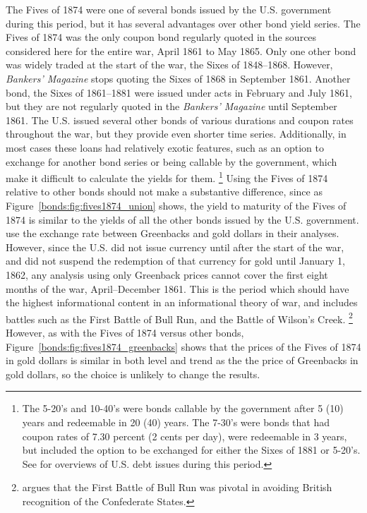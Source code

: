 The Fives of 1874 were one of several bonds issued by the U.S. government during this period, but it has several advantages over other bond yield series.
The Fives of 1874 was the only coupon bond regularly quoted in the sources considered here for the entire war, April 1861 to May 1865.
Only one other bond was widely traded at the start of the war, the Sixes of 1848--1868.
However, \textit{Bankers' Magazine} stops quoting the Sixes of 1868 in September 1861.
Another bond, the  Sixes of 1861--1881 were issued under acts in February and July 1861, but they are not regularly quoted in the \textit{Bankers' Magazine} until September 1861.
The U.S. issued several other bonds of various durations and coupon rates throughout the war, but they provide even shorter time series.
Additionally, in most cases these loans had relatively exotic features, such as an option to exchange for another bond series or being callable by the government, which make it difficult to calculate the yields for them.
\footnote{
  The 5-20's and 10-40's were bonds callable by the government after 5 (10) years and redeemable in 20 (40) years.
  The 7-30's were bonds that had coupon rates of 7.30 percent (2 cents per day), were redeemable in 3 years, but included the option to be exchanged for either the Sixes of 1881 or 5-20's.
  See \textcites{Bayley1882}{DeKnight1900}[297--309]{HomerSylla2005} for overviews of U.S. debt issues during this period.
}
Using the Fives of 1874 relative to other bonds should not make a substantive difference, since as Figure~\ref{bonds:fig:fives1874_union} shows, the yield to maturity of the Fives of 1874 is similar to the yields of all the other bonds issued by the U.S. government.
\textcites{WillardGuinnaneEtAl1996}{McCandless1996}{SmithSmith1997} use the exchange rate between Greenbacks and gold dollars in their analyses.
However, since the U.S. did not issue currency until after the start of the war, and did not suspend the redemption of that currency for gold until January 1, 1862, any analysis using only Greenback prices cannot cover the first eight months of the war, April--December 1861.
This is the period which should have the highest informational content in an informational theory of war, and includes battles such as the First Battle of Bull Run, and the Battle of Wilson's Creek.%
\footnote{\textcite{Poast2012} argues that the First Battle of Bull Run was pivotal in avoiding British recognition of the Confederate States.}
However, as with the Fives of 1874 versus other bonds,  Figure~\ref{bonds:fig:fives1874_greenbacks} shows that the prices of the Fives of 1874 in gold dollars is similar in both level and trend as the the price of Greenbacks in gold dollars, so the choice is unlikely to change the results.


